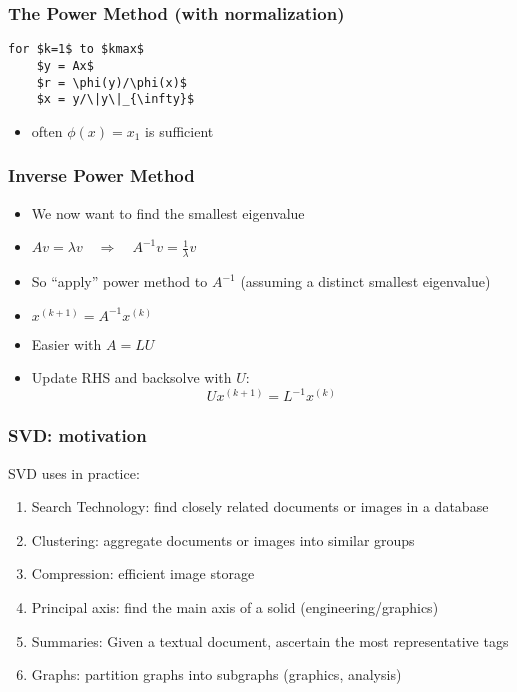 \documentclass[10pt]{beamer}
\begin{document}
\begin{frame}[fragile]
\frametitle{The Power Method (with normalization)}
\begin{lstlisting}[mathescape]
for $k=1$ to $kmax$
    $y = Ax$
    $r = \phi(y)/\phi(x)$
    $x = y/\|y\|_{\infty}$
\end{lstlisting}
\begin{itemize}
    \item often $\phi(x) = x_1$ is sufficient
\end{itemize}
\end{frame}
\begin{frame}
\frametitle{Inverse Power Method}
\begin{itemize}
    \item We now want to find the smallest eigenvalue
    \item $Av=\lambda v \quad \Rightarrow \quad A^{-1}v = \frac{1}{\lambda} v$
    \item So ``apply'' power method to $A^{-1}$ (assuming a distinct smallest
eigenvalue)
    \item $x^{(k+1)} = A^{-1} x^{(k)}$
    \item Easier with $A=LU$
    \item Update RHS and backsolve with $U$:
\[
    U x^{(k+1)} = L^{-1} x^{(k)}
\]
\end{itemize}
\end{frame}
\begin{frame}
\frametitle{SVD: motivation}
SVD uses in practice:
\begin{enumerate}
    \item Search Technology: find closely related documents or images in a
database
    \item Clustering: aggregate documents or images into similar groups
    \item Compression: efficient image storage
    \item Principal axis: find the main axis of a solid (engineering/graphics)
    \item Summaries: Given a textual document, ascertain the most representative
tags
    \item Graphs: partition graphs into subgraphs (graphics, analysis)
\end{enumerate}
\end{frame}
\end{document}
